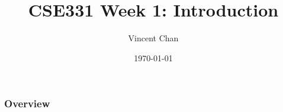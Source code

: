 \documentclass[t]{beamer}
\begin{document}
    \author{Vincent Chan}
    \title{CSE331 Week 1: Introduction}
    \date{\today}


    \begin{frame}
        \titlepage
    \end{frame}


    
    
    \begin{frame}
        \frametitle{Overview}
        \tableofcontents
    \end{frame}
\end{document}
